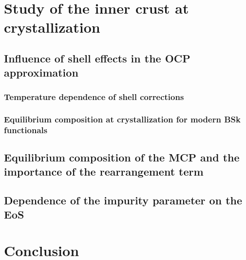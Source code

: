 \section{Study of the inner crust at crystallization}

\subsection{Influence of shell effects in the OCP
approximation}\label{subsec:shtemp}

\subsubsection{Temperature dependence of shell corrections}


\subsubsection{Equilibrium composition at crystallization for modern BSk 
functionals}


\subsection{Equilibrium composition of the MCP and the importance of the
rearrangement term}

\subsection{Dependence of the impurity parameter on the EoS}

\section{Conclusion}
